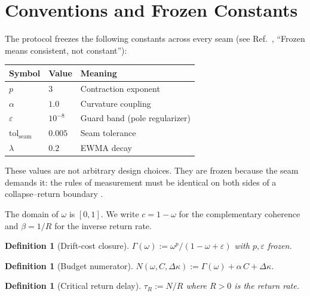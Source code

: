 \documentclass[
  aps,
  prd,
  twocolumn,
  showpacs,
  superscriptaddress,
  nofootinbib,
  floatfix
]{revtex4-2}
\newtheorem{definition}[theorem]{Definition}
\newcommand{\tR}{\tau_{\!R}}
\newcommand{\Gam}{\Gamma}
\newcommand{\eps}{\varepsilon}
\newcommand{\tolseam}{\mathrm{tol}_{\mathrm{seam}}}
\begin{document}
\section{Conventions and Frozen Constants}\label{sec:conventions}

The protocol freezes the following constants across every seam
(see Ref.~\cite{paulus2025physicscoherence}, ``Frozen means
consistent, not constant''):

\begin{center}
\begin{tabular}{@{}lll@{}}
\toprule
Symbol & Value & Meaning \\
\midrule
$p$ & $3$ & Contraction exponent \\
$\alpha$ & $1.0$ & Curvature coupling \\
$\eps$ & $10^{-8}$ & Guard band (pole regularizer) \\
$\tolseam$ & $0.005$ & Seam tolerance \\
$\lambda$ & $0.2$ & EWMA decay \\
\bottomrule
\end{tabular}
\end{center}

These values are not arbitrary design choices.  They are frozen
because the seam demands it: the rules of measurement must be
identical on both sides of a collapse--return boundary
\cite{paulus2025physicscoherence}.

The domain of $\omega$ is $[0,1]$.
We write $c=1-\omega$ for the complementary coherence and
$\beta=1/R$ for the inverse return rate.

\begin{definition}[Drift-cost closure]\label{def:gamma}
$\Gam(\omega) := \omega^{p}/(1-\omega+\eps)$ with $p,\eps$ frozen.
\end{definition}

\begin{definition}[Budget numerator]\label{def:N}
$N(\omega,C,\Delta\kappa) := \Gam(\omega) + \alpha\,C + \Delta\kappa$.
\end{definition}

\begin{definition}[Critical return delay]\label{def:tRstar}
$\tR := N/R$ where $R>0$ is the return rate.
\end{definition}

\end{document}
